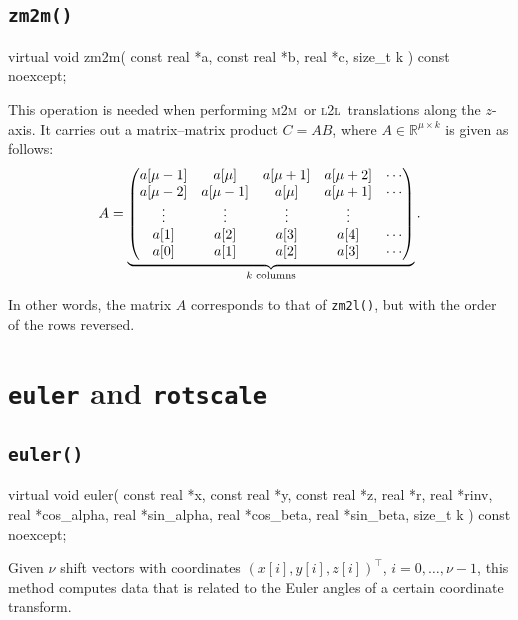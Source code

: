 \documentclass{scrbook}
\newcommand{\MtoM}{\textsc{m2m}}
\newcommand{\LtoL}{\textsc{l2l}}
\newcommand{\reals}{\ensuremath{\mathbb{R}}}
\begin{document}
\subsection{\texorpdfstring{\lstinline|zm2m()|}{zm2m()}}
\begin{cppcode*}
virtual void zm2m( const real *a, const real *b, real *c, size_t k ) const noexcept;
\end{cppcode*}
This operation is needed when performing \MtoM\ or \LtoL\ translations along
the $z$-axis. It carries out a matrix--matrix product $C=AB$, where
$A\in\reals^{\mu\times k}$ is given as follows:
\begin{equation}
A =
\underbrace{%
\begin{pmatrix}
a[\mu-1] & a[\mu]   & a[\mu+1] & a[\mu+2] & \cdots \\
a[\mu-2] & a[\mu-1] & a[\mu]   & a[\mu+1] & \cdots \\
\vdots   & \vdots   & \vdots   & \vdots   &        \\
a[1]     & a[2]     & a[3]     & a[4]     & \cdots \\
a[0]     & a[1]     & a[2]     & a[3]     & \cdots \\
\end{pmatrix}}_{\text{$k$ columns}}.
\end{equation}

In other words, the matrix $A$ corresponds to that of \lstinline|zm2l()|, but
with the order of the rows reversed.


\section{\texorpdfstring{\lstinline|euler|}{euler} and
\texorpdfstring{\lstinline|rotscale|}{rotscale}}

\subsection{\texorpdfstring{\lstinline|euler()|}{euler}}
\begin{cppcode*}
virtual void euler( const real *x,   const real *y, const real *z,
                          real *r,         real *rinv,
                          real *cos_alpha, real *sin_alpha,
                          real *cos_beta,  real *sin_beta,
                    size_t k ) const noexcept;
\end{cppcode*}

Given $\nu$ shift vectors with coordinates $(x[i],y[i],z[i])^\top$, $i=0,
\dotsc,\nu-1$, this method computes data that is related to the Euler angles
of a certain coordinate transform.
\end{document}
